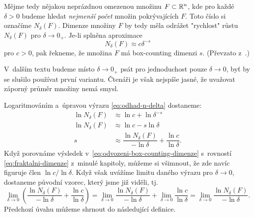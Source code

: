 Mějme tedy nějakou neprázdnou omezenou množinu $F\subset\mathbb{R}^n$, kde pro každé $\delta>0$ budeme hledat \emph{nejmenší počet} množin pokrývajících $F$. Toto číslo si označíme $N_\delta(F)$. Dimenze množiny $F$ by tedy měla odrážet "rychlost" růstu $N_\delta(F)$ pro $\delta\to 0_+$. Je-li splněna aproximace
\begin{equation}\label{eq:odhad-n-delta}
    N_\delta(F)\approx c\delta^{-s}
\end{equation}
pro $c>0$, pak řekneme, že množina $F$ má box-counting dimenzi $s$. (Převzato z~\citep[str. 27]{Falconer2014}.)
\begin{remark}
    V~dalším textu budeme místo $\delta\to 0_+$ psát pro jednoduchost pouze $\delta\to 0$, byť by se slušilo používat první variantu. Čtenáři je však nejspíše jasné, že uvažovat záporný průměr množiny nemá smysl.
\end{remark}
Logaritmováním a~úpravou výrazu \eqref{eq:odhad-n-delta} dostaneme:
\begin{align}\label{eq:odvozeni-box-counting-dimenze}
    \ln{N_\delta(F)}&\approx\ln{c}+\ln{\delta^{-s}}\\
    \ln{N_\delta(F)}&\approx\ln{c}-s\ln{\delta}\\
    s&\approx\dfrac{\ln{N_\delta(F)}}{-\ln{\delta}}+\dfrac{\ln{c}}{\ln{\delta}}.
\end{align}
Když porovnáme výsledek v~\eqref{eq:odvozeni-box-counting-dimenze} s~rovností \eqref{eq:fraktalni-dimenze} z~minulé kapitoly, můžeme si všimnout, že zde navíc figuruje člen $\ln{c}/\ln{\delta}$. Když však uvážíme limitu daného výrazu pro $\delta\to 0$, dostaneme původní vzorec, který jsme již viděli, tj.
\[\lim_{\delta\to 0}\left(\dfrac{\ln{N_\delta(F)}}{-\ln{\delta}}+\dfrac{\ln{c}}{\ln{\delta}}\right)=\lim_{\delta\to 0}\dfrac{\ln{N_\delta(F)}}{-\ln{\delta}}+\lim_{\delta\to 0}\dfrac{\ln{c}}{\ln{\delta}}=\lim_{\delta\to 0}\dfrac{\ln{N_\delta(F)}}{-\ln{\delta}}.\]
Předchozí úvahu můžeme shrnout do následující definice.
